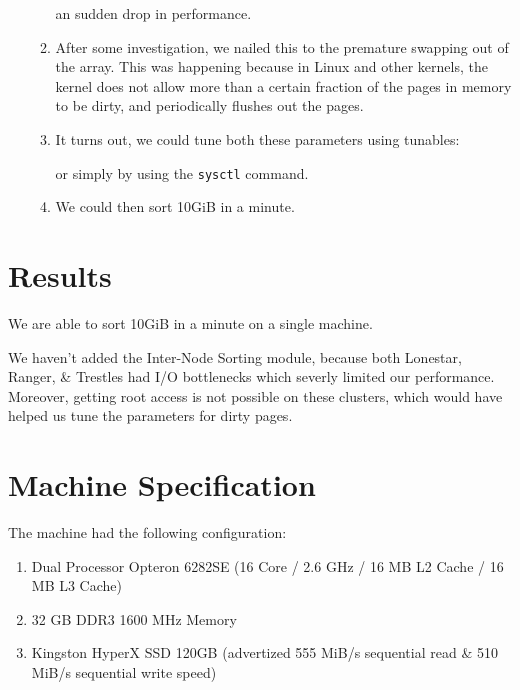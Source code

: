 \documentclass{article}
\begin{document}
\begin{enumerate}
\begin{enumerate}
	an sudden drop in performance.
	\item After some investigation, we nailed this to the premature swapping out of the array.
	This was happening because in Linux and other kernels, the kernel does not allow more than
	a certain fraction of the pages in memory to be dirty, and periodically flushes out the
	pages.
	\item It turns out, we could tune both these parameters using tunables:
          or simply by using the \verb#sysctl# command.
	\item We could then sort 10GiB in a minute.
	\end{enumerate}
\end{enumerate}

\section{Results}
We are able to sort 10GiB in a minute on a single machine.

We haven't added the Inter-Node Sorting module, because both Lonestar,
Ranger, \& Trestles had I/O bottlenecks which severly limited our
performance. Moreover, getting root access is not possible on these
clusters, which would have helped us tune the parameters for dirty
pages.


\section{Machine Specification}
The machine had the following configuration:
\begin{enumerate}
\item Dual Processor Opteron 6282SE (16 Core / 2.6 GHz / 16 MB L2 Cache / 16 MB L3 Cache)
\item 32 GB DDR3 1600 MHz Memory
\item Kingston HyperX SSD 120GB (advertized 555 MiB/s sequential read \& 510 MiB/s sequential write speed)
\end{enumerate}
\end{document}
